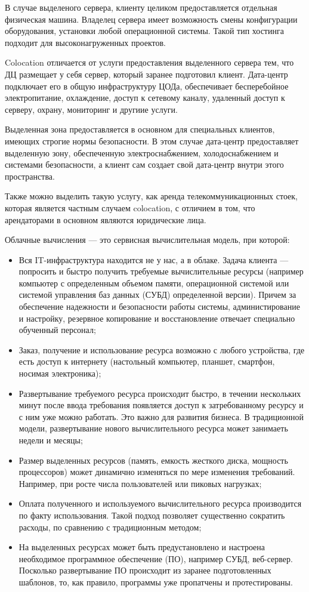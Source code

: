 В случае выделеного сервера, клиенту целиком предоставляется отдельная физическая машина.
Владелец сервера имеет возможность смены конфигурации оборудования, установки любой операционной системы.
Такой тип хостинга подходит для высоконагруженных проектов.

Colocation отличается от услуги предоставления выделенного сервера тем, что ДЦ размещает у себя сервер, который заранее подготовил клиент.
Дата-центр подключает его в общую инфраструктуру ЦОДа, обеспечивает бесперебойное электропитание, охлаждение, доступ к сетевому каналу, удаленный доступ к серверу, охрану, мониторинг и другиие услуги.

Выделенная зона предоставляется в основном для специальных клиентов, имеющих строгие нормы безопасности.
В этом случае дата-центр предоставляет выделенную зону, обеспеченную электроснабжением, холодоснабжением и системами безопасности, а клиент сам создает свой дата-центр внутри этого пространства.

Также можно выделить такую услугу, как аренда телекоммуникационных стоек, которая является частным случаем colocation, с отличием в том, что арендаторами в основном являются юридические лица.

Облачные вычисления --- это сервисная вычислительная модель, при которой:
\begin{itemize}
  \item Вся IT-инфраструктура находится не у нас, а в облаке.
  Задача клиента --- попросить и быстро получить требуемые вычислительные ресурсы (например компьютер с определенным объемом памяти, операционной системой или системой управления баз данных (СУБД) определенной версии).
  Причем за обеспечение надежности и безопасности работы системы, администирование и настройку, резервное копирование и восстановление отвечает специально обученный персонал;
  \item Заказ, получение и использование ресурса возможно с любого устройства, где есть доступ к интернету (настольный компьютер, планшет, смартфон, носимая электроника);
  \item Развертывание требуемого ресурса происходит быстро, в течении нескольких минут после ввода требования появляется доступ к затребованному ресурсу и с ним уже можно работать.
  Это важно для развития бизнеса.
  В традиционной модели, развертывание нового вычислительного ресурса может занимаеть недели и месяцы;
  \item Размер выделенных ресурсов (память, емкость жесткого диска, мощность процессоров) может динамично изменяться по мере изменения требований.
  Например, при росте числа пользователей или пиковых нагрузках;
  \item Оплата полученного и используемого вычислительного ресурса производится по факту использования.
  Такой подход позволяет существенно сократить расходы, по сравнению с традиционным методом;
  \item На выделенных ресурсах может быть предустановлено и настроена необходимое программное обеспечение (ПО), например СУБД, веб-сервер.
  Посколько развертывание ПО происходит из заранее подготовленных шаблонов, то, как правило, программы уже пропатчены и протестированы.
\end{itemize}

